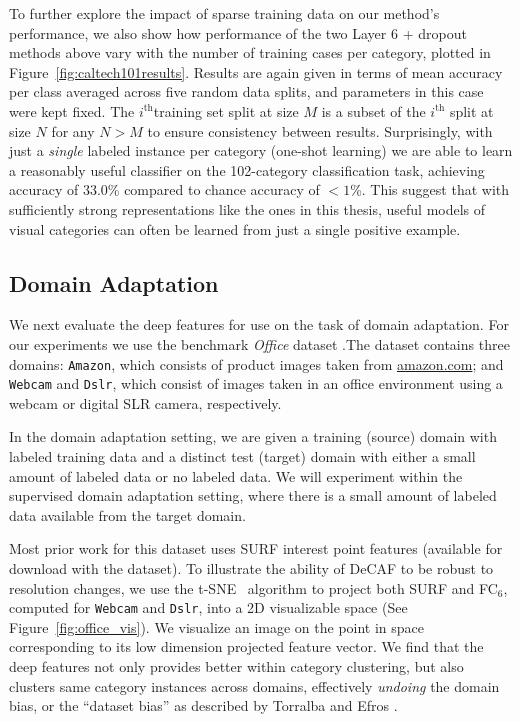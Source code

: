 To further explore the impact of sparse training data on our method's performance, we also show how performance of the two Layer 6 + dropout methods above vary with the number of training cases per category, plotted in Figure~\ref{fig:caltech101results}. Results are again given in terms of mean accuracy per class averaged across five random data splits, and parameters in this case were kept fixed. The $i^{\mathrm{th}}$training set split at size $M$ is a subset of the $i^{\mathrm{th}}$ split at size $N$ for any $N > M$ to ensure consistency between results. Surprisingly, with just a \textit{single} labeled instance per category (one-shot learning) we are able to learn a reasonably useful classifier on the 102-category classification task, achieving accuracy of 33.0\% compared to chance accuracy of $<1$\%. This suggest that with sufficiently strong representations like the ones in this thesis, useful models of visual categories can often be learned from just a single positive example.

\subsection{Domain Adaptation}
We next evaluate the deep features for use on the task of domain adaptation. For our experiments we use the benchmark \textit{Office} dataset \cite{eccv_saenko}.The dataset contains three domains: \texttt{Amazon}, which consists of product images taken from \url{amazon.com}; and \texttt{Webcam} and \texttt{Dslr}, which consist of images taken in an office environment using a webcam or digital SLR camera, respectively. 

In the domain adaptation setting, we are given a training (source) domain with labeled training data and a distinct test (target) domain with either a small amount of labeled data or no labeled data. We will experiment within the supervised domain adaptation setting, where there is a small amount of labeled data available from the target domain. 

Most prior work for this dataset uses SURF \cite{surf06} interest point features (available for download with the dataset). To illustrate the ability of DeCAF to be robust to resolution changes, we use the t-SNE~\cite{tsne} algorithm to project both SURF and FC$_6$, computed for \texttt{Webcam} and \texttt{Dslr}, into a 2D visualizable space (See Figure~\ref{fig:office_vis}). We visualize an image on the point in space corresponding to its low dimension projected feature vector. We find that the deep features not only provides better within category clustering, but also clusters same category instances across domains, effectively \emph{undoing} the domain bias, or the ``dataset bias'' as described by Torralba and Efros \cite{torralba2011unbiased}.

